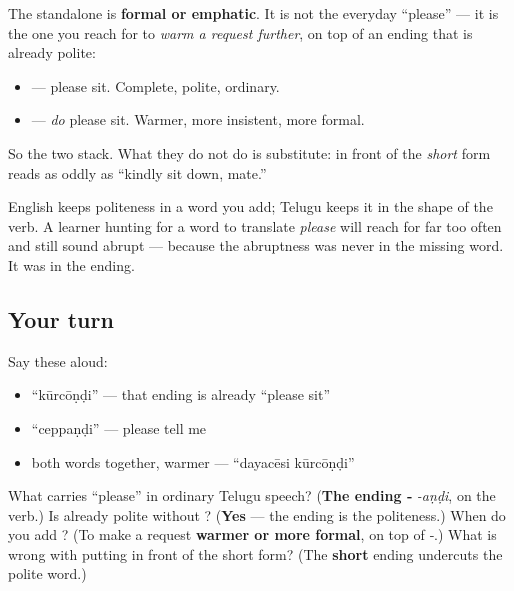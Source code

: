 \begin{culture}
The standalone \textbf{} is \textbf{formal or emphatic}. It is not the everyday \textquotedblleft{}please\textquotedblright{} — it is the one you reach for to \emph{warm a request further}, on top of an ending that is already polite:

\begin{itemize}
\raggedright
  \item \textbf{} — please sit. Complete, polite, ordinary.
  \item \textbf{ } — \emph{do} please sit. Warmer, more insistent, more formal.
\end{itemize}

So the two stack. What they do not do is substitute: \textbf{} in front of the \emph{short} form reads as oddly as \textquotedblleft{}kindly sit down, mate.\textquotedblright{}

English keeps politeness in a word you add; Telugu keeps it in the shape of the verb. A learner hunting for a word to translate \emph{please} will reach for \textbf{} far too often and still sound abrupt — because the abruptness was never in the missing word. It was in the ending.
\end{culture}

\subsection*{Your turn}
Say these aloud:

\begin{itemize}
\raggedright
  \item \textquotedblleft{}kūrcōṇḍi\textquotedblright{} — that ending is already \textquotedblleft{}please sit\textquotedblright{}
  \item \textquotedblleft{}ceppaṇḍi\textquotedblright{} — please tell me
  \item both words together, warmer — \textquotedblleft{}dayacēsi kūrcōṇḍi\textquotedblright{}
\end{itemize}

\begin{tcolorbox}[breakable,colback=teal!4,colframe=teal!35!black,title={Before you move on}]
What carries \textquotedblleft{}please\textquotedblright{} in ordinary Telugu speech? (\textbf{The ending ‑} \emph{-aṇḍi}, on the verb.) Is \textbf{} already polite without \textbf{}? (\textbf{Yes} — the ending is the politeness.) When do you add \textbf{}? (To make a request \textbf{warmer or more formal}, on top of ‑.) What is wrong with putting \textbf{} in front of the short form? (The \textbf{short} ending undercuts the polite word.)
\end{tcolorbox}
